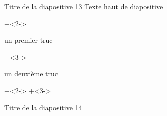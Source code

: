 \documentclass[10pt]{beamer}
\begin{document}
\begin{frame}[fragile]{Titre de la diapositive 13}
Texte haut de diapositive
\begin{itemize}
	\onslide+<2->{\item un premier truc} %
	\onslide+<3->{\item un deuxième truc} %
\end{itemize}
	\vspace{0.5cm}
	\onslide+<2->{} %
	\hfill
	\onslide+<3->{} %
\end{frame} 

\begin{frame}{Titre de la diapositive 14} %
\begin{center}
\end{center}
\end{frame}
\end{document}
